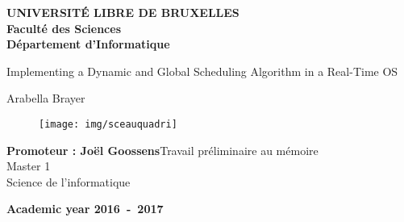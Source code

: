 \documentclass[11pt,a4paper,oneside]{report}
\begin{document}
\begin{titlepage}


\begin{center}
\textbf{UNIVERSITÉ LIBRE DE BRUXELLES}\\
\textbf{Faculté des Sciences}\\
\textbf{Département d'Informatique}
\vfill{}\vfill{}

{\Huge  Implementing a Dynamic and Global Scheduling Algorithm  \vspace*{.5cm}  \linebreak[4] in a Real-Time OS}

{\Huge \par}
\begin{center}{\LARGE Arabella Brayer}\end{center}{\Huge \par}

\vfill{}

\begin{figure}[h]
	\begin{center}
	\texttt{[image: img/sceauquadri]}
	\label{fig:sceauquadri}
	\end{center}
\end{figure}
\vfill{}



\begin{flushright}{\large \textbf{Promoteur : Joël Goossens}}\hfill{}{\large Travail préliminaire au mémoire}\\
{
 }\hfill{}{\large Master 1}\\
\hfill{}{\large Science de l'informatique}\end{flushright}{\large\par}
\vfill{}\vfill{}\enlargethispage{3cm}
\textbf{Academic year 2016~-~2017}
\end{center}
\end{titlepage}
\newpage
\thispagestyle{empty} 
\null

\newenvironment{vcenterpage}
{\newpage\thispagestyle{empty} 
\vspace*{\fill}}
{\vspace*{\fill}\par\pagebreak}


\end{document}
